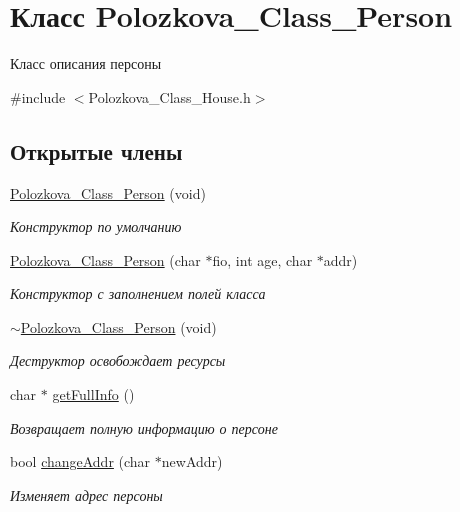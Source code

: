 \hypertarget{class_polozkova___class___person}{\section{Класс Polozkova\+\_\+\+Class\+\_\+\+Person}
\label{class_polozkova___class___person}
}


Класс описания персоны  




{\ttfamily \#include $<$Polozkova\+\_\+\+Class\+\_\+\+House.\+h$>$}

\subsection*{Открытые члены}
\begin{DoxyCompactItemize}
\item 
\hyperlink{class_polozkova___class___person_a116523b08dcffdf8a65b77cc89f01163}{Polozkova\+\_\+\+Class\+\_\+\+Person} (void)
\begin{DoxyCompactList}\small\item\em Конструктор по умолчанию \end{DoxyCompactList}\item 
\hyperlink{class_polozkova___class___person_aa6400f3b0873599b385f29103f671f8d}{Polozkova\+\_\+\+Class\+\_\+\+Person} (char $\ast$fio, int age, char $\ast$addr)
\begin{DoxyCompactList}\small\item\em Конструктор с заполнением полей класса \end{DoxyCompactList}\item 
\hypertarget{class_polozkova___class___person_a3d28a97e97d0e04ceb8a92dc6c908187}{\hyperlink{class_polozkova___class___person_a3d28a97e97d0e04ceb8a92dc6c908187}{$\sim$\+Polozkova\+\_\+\+Class\+\_\+\+Person} (void)}\label{class_polozkova___class___person_a3d28a97e97d0e04ceb8a92dc6c908187}

\begin{DoxyCompactList}\small\item\em Деструктор освобождает ресурсы \end{DoxyCompactList}\item 
char $\ast$ \hyperlink{class_polozkova___class___person_ad6687da4afac6e02d3a2f31660997548}{get\+Full\+Info} ()
\begin{DoxyCompactList}\small\item\em Возвращает полную информацию о персоне \end{DoxyCompactList}\item 
bool \hyperlink{class_polozkova___class___person_a694af5d08c95cd7b3ee3faf5250ef0a9}{change\+Addr} (char $\ast$new\+Addr)
\begin{DoxyCompactList}\small\item\em Изменяет адрес персоны \end{DoxyCompactList}\end{DoxyCompactItemize}
